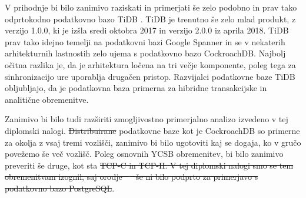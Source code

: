 \documentclass[a4paper, 12pt]{book}
\providecommand{\DIFaddtex}[1]{{\protect\color{blue}\uwave{#1}}} %
\providecommand{\DIFdeltex}[1]{{\protect\color{red}\sout{#1}}}                      %
\providecommand{\DIFaddbegin}{} %
\providecommand{\DIFaddend}{} %
\providecommand{\DIFdelbegin}{} %
\providecommand{\DIFdelend}{} %
\providecommand{\DIFadd}[1]{\texorpdfstring{\DIFaddtex{#1}}{#1}} %
\providecommand{\DIFdel}[1]{\texorpdfstring{\DIFdeltex{#1}}{}} %
\newcommand{\DIFscaledelfig}{0.5}
\newlength{\DIFdelgraphicswidth} %
\newlength{\DIFdelgraphicsheight} %
\newcommand{\DIFaddincludegraphics}[2][]{{\color{blue}\fbox{\DIFOincludegraphics[#1]{#2}}}} %
\newcommand{\DIFdelincludegraphics}[2][]{%
\sbox{\DIFdelgraphicsbox}{\DIFOincludegraphics[#1]{#2}}%
\settoboxwidth{\DIFdelgraphicswidth}{\DIFdelgraphicsbox} %
\settoboxtotalheight{\DIFdelgraphicsheight}{\DIFdelgraphicsbox} %
\scalebox{\DIFscaledelfig}{%
\parbox[b]{\DIFdelgraphicswidth}{\usebox{\DIFdelgraphicsbox}\\[-\baselineskip] \rule{\DIFdelgraphicswidth}{0em}}\llap{\resizebox{\DIFdelgraphicswidth}{\DIFdelgraphicsheight}{%
\setlength{\unitlength}{\DIFdelgraphicswidth}%
\begin{picture}(1,1)%
\thicklines\linethickness{2pt} %
{\color[rgb]{1,0,0}\put(0,0){\framebox(1,1){}}}%
{\color[rgb]{1,0,0}\put(0,0){\line( 1,1){1}}}%
{\color[rgb]{1,0,0}\put(0,1){\line(1,-1){1}}}%
\end{picture}%
}\hspace*{3pt}}} %
} %
\DeclareRobustCommand{\DIFaddbegin}{\DIFOaddbegin \let\includegraphics\DIFaddincludegraphics} %
\DeclareRobustCommand{\DIFaddend}{\DIFOaddend \let\includegraphics\DIFOincludegraphics} %
\DeclareRobustCommand{\DIFdelbegin}{\DIFOdelbegin \let\includegraphics\DIFdelincludegraphics} %
\DeclareRobustCommand{\DIFdelend}{\DIFOaddend \let\includegraphics\DIFOincludegraphics} %
\begin{document}
V prihodnje bi bilo zanimivo raziskati in primerjati še zelo podobno in prav tako odprtokodno podatkovno bazo TiDB \cite{PingCAP-home}. TiDB je trenutno še zelo mlad produkt, z verzijo 1.0.0, ki je izšla sredi oktobra 2017 in verzijo 2.0.0 iz aprila 2018. TiDB prav tako idejno temelji na podatkovni bazi Google Spanner in se v nekaterih arhitekturnih lastnostih zelo ujema s podatkovno bazo CockroachDB. Najbolj očitna razlika je, da je arhitektura ločena na tri večje komponente, poleg tega za sinhronizacijo ure uporablja drugačen pristop. Razvijalci podatkovne baze TiDB obljubljajo, da je podatkovna baza primerna za hibridne transakcijske in analitične obremenitve.

Zanimivo bi bilo tudi razširiti zmogljivostno primerjalno analizo izvedeno v tej diplomski nalogi. \DIFdelbegin \DIFdel{Distribuirane }\DIFdelend \DIFaddbegin \DIFadd{Porazdeljene }\DIFaddend podatkovne baze kot je CockroachDB so primerne za okolja z vsaj tremi vozlišči, zanimivo bi bilo ugotoviti kaj se dogaja, ko v gručo povežemo še več vozlišč. Poleg osnovnih YCSB obremenitev, bi bilo zanimivo preveriti še druge, kot sta \DIFdelbegin \DIFdel{TCP-C in TCP-H. V tej diplomski nalogi smo se tem obremenitvam izognil, saj orodje \mbox{%
\cite{cockroachdb/loadgen} }\hspace{0pt}%
še ni bilo podprto za primerjavo s podatkovno bazo PostgreSQL}\DIFdelend \DIFaddbegin \DIFadd{TPC-C in TPC-H}\DIFaddend .


\newpage %
\ \\
\clearpage
{}


\end{document}
